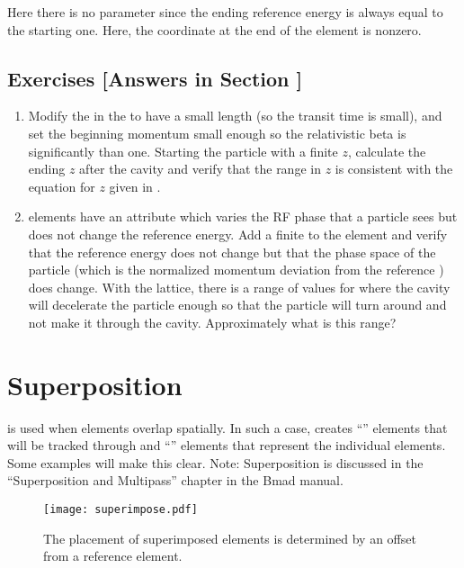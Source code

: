 \documentclass{hitec}     %
\newcommand{\Section}[1]{\section{#1}\vspace*{-1ex}}
\begin{document}
{Here there is no  parameter since the ending reference energy is always equal to the
starting one. Here, the  coordinate at the end of the element is nonzero.

\subsection{Exercises [Answers in Section ]}
\label{s:phase.space.ex}

\begin{enumerate}[label=\thesection.\arabic{enumi}]
\item 
Modify the  in the  to have a small length (so the transit time is
small), and set the beginning momentum small enough so the relativistic beta is significantly than
one. Starting the particle with a finite $z$, calculate the ending $z$ after the cavity and verify
that the range in $z$ is consistent with the equation for $z$ given in .
%
\item
{} elements have an attribute  which varies the RF phase that a particle sees
but does not change the reference energy. Add a finite  to the  element and
verify that the reference energy does not change but that the phase space  of the particle
(which is the normalized momentum deviation from the reference ) does
change. With the  lattice, there is a range of values for  where the
cavity will decelerate the particle enough so that the particle will turn around and not make
it through the cavity. Approximately what is this range?
\end{enumerate}

\newpage

\Section{Superposition}
\label{s:super}

 is used when elements overlap spatially. In such a case, \bmad creates
``'' elements that will be tracked through and ``'' elements that represent the
individual elements.  Some examples will make this clear. Note: Superposition is discussed in the
``Superposition and Multipass'' chapter in the Bmad manual.

\begin{figure}[b]
  \centering
  \texttt{[image: superimpose.pdf]}
  \caption{The placement of superimposed elements is determined by an offset from a reference element.}
  \label{f:superimpose}
\end{figure}

}
\end{document}
